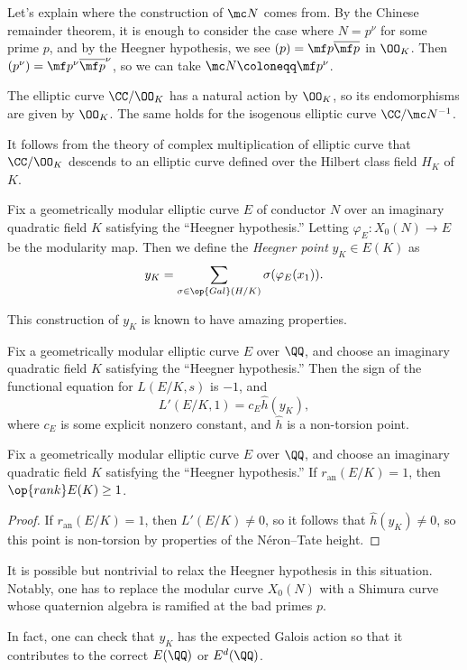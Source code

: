 \documentclass[../notes.tex]{subfiles}
\begin{document}
\begin{remark}
	Let's explain where the construction of $\mc N$ comes from. By the Chinese remainder theorem, it is enough to consider the case where $N=p^\nu$ for some prime $p$, and by the Heegner hypothesis, we see $(p)=\mf p\overline{\mf p}$ in $\OO_K$. Then $\left(p^\nu\right)=\mf p^\nu\overline{\mf p}^\nu$, so we can take $\mc N\coloneqq\mf p^\nu$.
\end{remark}
\begin{remark}
	The elliptic curve $\CC/\OO_K$ has a natural action by $\OO_K$, so its endomorphisms are given by $\OO_K$. The same holds for the isogenous elliptic curve $\CC/\mc N^{-1}$.
\end{remark}
\begin{remark}
	It follows from the theory of complex multiplication of elliptic curve that $\CC/\OO_K$ descends to an elliptic curve defined over the Hilbert class field $H_K$ of $K$.
\end{remark}
\begin{definition}
	Fix a geometrically modular elliptic curve $E$ of conductor $N$ over an imaginary quadratic field $K$ satisfying the ``Heegner hypothesis.'' Letting $\varphi_E\colon X_0(N)\to E$ be the modularity map. Then we define the \textit{Heegner point} $y_K\in E(K)$ as
	\[y_K=\sum_{\sigma\in\op{Gal}(H/K)}\sigma(\varphi_E(x_1)).\]
\end{definition}
This construction of $y_K$ is known to have amazing properties.
\begin{theorem} \label{thm:gz}
	Fix a geometrically modular elliptic curve $E$ over $\QQ$, and choose an imaginary quadratic field $K$ satisfying the ``Heegner hypothesis.'' Then the sign of the functional equation for $L(E/K,s)$ is $-1$, and
	\[L'(E/K,1)=c_E\hat h(y_K),\]
	where $c_E$ is some explicit nonzero constant, and $\hat h$ is a non-torsion point.
\end{theorem}
\begin{corollary}
	Fix a geometrically modular elliptic curve $E$ over $\QQ$, and choose an imaginary quadratic field $K$ satisfying the ``Heegner hypothesis.'' If $r_{\mathrm{an}}(E/K)=1$, then $\op{rank}E(K)\ge1$.
\end{corollary}
\begin{proof}
	If $r_{\mathrm{an}}(E/K)=1$, then $L'(E/K)\ne0$, so it follows that $\hat h(y_K)\ne0$, so this point is non-torsion by properties of the N\'eron--Tate height.
\end{proof}
\begin{remark}
	It is possible but nontrivial to relax the Heegner hypothesis in this situation. Notably, one has to replace the modular curve $X_0(N)$ with a Shimura curve whose quaternion algebra is ramified at the bad primes $p$.
\end{remark}
\begin{remark}
	In fact, one can check that $y_K$ has the expected Galois action so that it contributes to the correct $E(\QQ)$ or $E^d(\QQ)$.
\end{remark}
\end{document}
